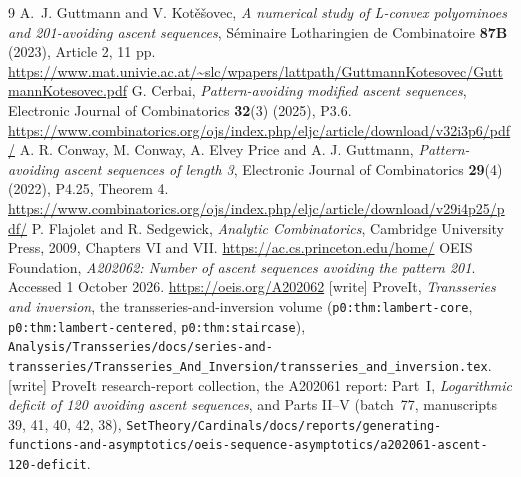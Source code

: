 \documentclass[11pt,letterpaper]{article}
\theoremstyle{remark}\newtheorem{remark}[theorem]{Remark}
\begin{document}
\begingroup\raggedright
\begin{thebibliography}{9}
 A.~J. Guttmann and V. Kot\v{e}\v{s}ovec, \emph{A numerical study of L-convex polyominoes and 201-avoiding ascent sequences}, S\'eminaire Lotharingien de Combinatoire \textbf{87B} (2023), Article 2, 11 pp.\newline
\url{https://www.mat.univie.ac.at/~slc/wpapers/lattpath/GuttmannKotesovec/GuttmannKotesovec.pdf}
 G. Cerbai, \emph{Pattern-avoiding modified ascent sequences}, Electronic Journal of Combinatorics \textbf{32}(3) (2025), P3.6.\newline
\url{https://www.combinatorics.org/ojs/index.php/eljc/article/download/v32i3p6/pdf/}
 A. R. Conway, M. Conway, A. Elvey Price and A. J. Guttmann, \emph{Pattern-avoiding ascent sequences of length 3}, Electronic Journal of Combinatorics \textbf{29}(4) (2022), P4.25, Theorem 4.\newline
\url{https://www.combinatorics.org/ojs/index.php/eljc/article/download/v29i4p25/pdf/}
 P. Flajolet and R. Sedgewick, \emph{Analytic Combinatorics}, Cambridge University Press, 2009, Chapters VI and VII.\newline
\url{https://ac.cs.princeton.edu/home/}
 OEIS Foundation, \emph{A202062: Number of ascent sequences avoiding the pattern 201}. Accessed 1 October 2026.\newline
\url{https://oeis.org/A202062}
 [write] ProveIt, \emph{Transseries and inversion}, the
transseries-and-inversion volume (\texttt{p0:thm:lambert-core},
\texttt{p0:thm:lambert-centered}, \texttt{p0:thm:staircase}),
\nolinkurl{Analysis/Transseries/docs/series-and-transseries/Transseries_And_Inversion/transseries_and_inversion.tex}.
 [write] ProveIt research-report collection, the
A202061 report: Part~I, \emph{Logarithmic deficit of 120 avoiding ascent
sequences}, and Parts II--V (batch~77, manuscripts 39, 41, 40, 42, 38),
\nolinkurl{SetTheory/Cardinals/docs/reports/generating-functions-and-asymptotics/oeis-sequence-asymptotics/a202061-ascent-120-deficit}.
\end{thebibliography}
\endgroup
\end{document}
